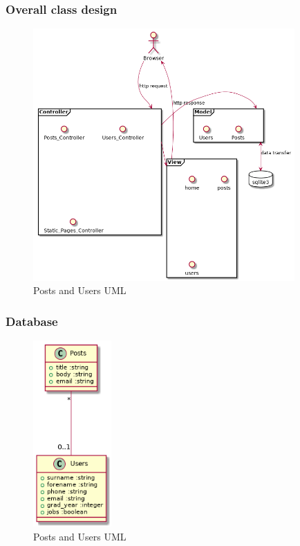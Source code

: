 \documentclass[a4paper]{article}
\begin{document}
\subsubsection{Overall class design}
\label{sec-2-1-1}
\begin{center}
\begin{figure}[htb]
\centering
\includegraphics[width=10cm]{classdesign.png}
\caption{\label{fig:classuml}Posts and Users UML}
\end{figure}
\end{center}


\subsubsection{Database}
\label{sec-2-1-2}
\begin{center}
\begin{figure}[htb]
\centering
\includegraphics[width=3cm]{posts-users.png}
\caption{\label{fig:userposts}Posts and Users UML}
\end{figure}
\end{center}
\end{document}
